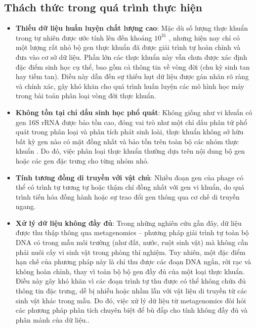 \subsection{Thách thức trong quá trình thực hiện}

\begin{itemize}
    \item \textbf{Thiếu dữ liệu huấn luyện chất lượng cao}: Mặc dù số lượng thực khuẩn trong tự nhiên được ước tính lên đến khoảng $10^{31}$ \cite{doi:10.1128/jb.00052-20}, nhưng hiện nay chỉ có một lượng rất nhỏ bộ gen thực khuẩn đã được giải trình tự hoàn chỉnh và đưa vào cơ sở dữ liệu. Phần lớn các thực khuẩn này vẫn chưa được xác định đặc điểm sinh học cụ thể, bao gồm cả thông tin về vòng đời (chu kỳ sinh tan hay tiềm tan). Điều này dẫn đến sự thiếu hụt dữ liệu được gán nhãn rõ ràng và chính xác, gây khó khăn cho quá trình huấn luyện các mô hình học máy trong bài toán phân loại vòng đời thực khuẩn.
    \item \textbf{Không tồn tại chỉ dấu sinh học phổ quát}: Không giống như vi khuẩn có gen 16S rRNA được bảo tồn cao, đóng vai trò như một chỉ dấu phân tử phổ quát trong phân loại và phân tích phát sinh loài, thực khuẩn không sở hữu bất kỳ gen nào có mặt đồng nhất và bảo tồn trên toàn bộ các nhóm thực khuẩn \cite{PMID:31061483}. Do đó, việc phân loại thực khuẩn thường dựa trên nội dung bộ gen hoặc các gen đặc trưng cho từng nhóm nhỏ.
    \item \textbf{Tính tương đồng di truyền với vật chủ}: Nhiều đoạn gen của phage có thể có trình tự tương tự hoặc thậm chí đồng nhất với gen vi khuẩn, do quá trình tiến hóa đồng hành hoặc sự trao đổi gen thông qua cơ chế di truyền ngang.
    \item \textbf{Xử lý dữ liệu không đầy đủ}: Trong những nghiên cứu gần đây, dữ liệu được thu thập thông qua metagenomics – phương pháp giải trình tự toàn bộ DNA có trong mẫu môi trường (như đất, nước, ruột sinh vật) mà không cần phải nuôi cấy vi sinh vật trong phòng thí nghiệm. Tuy nhiên, một đặc điểm hạn chế của phương pháp này là chỉ thu được các đoạn DNA ngắn, rời rạc và không hoàn chỉnh, thay vì toàn bộ bộ gen đầy đủ của một loại thực khuẩn. Điều này gây khó khăn vì các đoạn trình tự thu được có thể không chứa đủ thông tin đặc trưng, dễ bị nhiễu hoặc nhầm lẫn với vật liệu di truyền từ các sinh vật khác trong mẫu. Do đó, việc xử lý dữ liệu từ metagenomics đòi hỏi các phương pháp phân tích chuyên biệt để bù đắp cho tính không đầy đủ và phân mảnh của dữ liệu..
\end{itemize}

